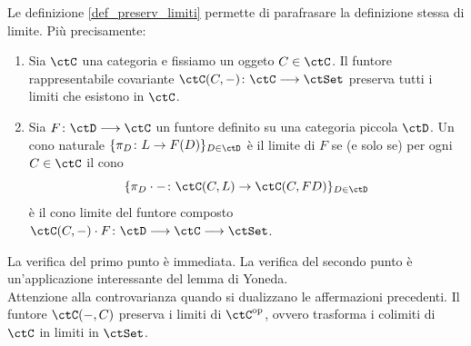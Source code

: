 \begin{remark}\label{oss_rappr_lim}
 Le definizione \ref{def_preserv_limiti} permette di parafrasare la definizione stessa di limite. Più precisamente:
 \begin{enumerate}
  \item Sia \(\ctC\) una categoria e fissiamo un oggeto \(C \in \ctC\). Il funtore rappresentabile covariante \(\ctC(C,-) \colon \ctC \fun \ctSet\)
        preserva tutti i limiti che esistono in \(\ctC\).
  \item Sia \(F \colon \ctD \fun \ctC\) un funtore definito su una categoria piccola \(\ctD\). Un cono naturale \(\{\pi_D \colon L \to F(D)\}_{D \in \ctD}\)
        è il limite di \(F\) se (e solo se) per ogni \(C \in \ctC\) il cono
        \[\{\pi_D \cdot - \colon \ctC(C,L) \to \ctC(C,FD)\}_{D \in \ctD}\]
        è il cono limite del funtore composto \(\ctC(C,-) \cdot F \colon \ctD \fun \ctC \fun \ctSet\).
 \end{enumerate}
 La verifica del primo punto è immediata. La verifica del secondo punto è un'applicazione interessante del lemma di Yoneda. \\
 Attenzione alla controvarianza quando si dualizzano le affermazioni precedenti. Il funtore \(\ctC(-,C)\) preserva i limiti di \(\ctC^{\op}\),
 ovvero trasforma i colimiti di \(\ctC\) in limiti in \(\ctSet\).
\end{remark}
\begin{definition}\label{def_rifl_limiti}
\end{definition}
\begin{definition}\label{def_creaz_limiti}
\end{definition}
\begin{proposition}\label{prop_dimenticante_alg_crea_limiti}
 \Todo{}
\end{proposition}


